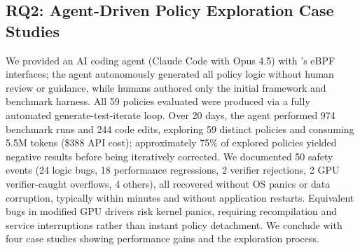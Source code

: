 \subsection{RQ2: Agent-Driven Policy Exploration Case Studies}

We provided an AI coding agent (Claude Code with Opus 4.5) with \sys{}'s eBPF interfaces; the agent autonomously generated all policy logic without human review or guidance, while humans authored only the initial framework and benchmark harness.
All 59 policies evaluated were produced via a fully automated generate-test-iterate loop.
Over 20 days, the agent performed 974 benchmark runs and 244 code edits, exploring 59 distinct policies and consuming 5.5M tokens (\$388 API cost); approximately 75\% of explored policies yielded negative results before being iteratively corrected.
We documented 50 safety events (24 logic bugs, 18 performance regressions, 2 verifier rejections, 2 GPU verifier-caught overflows, 4 others), all recovered without OS panics or data corruption, typically within minutes and without application restarts.
Equivalent bugs in modified GPU drivers risk kernel panics, requiring recompilation and service interruptions rather than instant policy detachment.
We conclude with four case studies showing performance gains and the exploration process.


